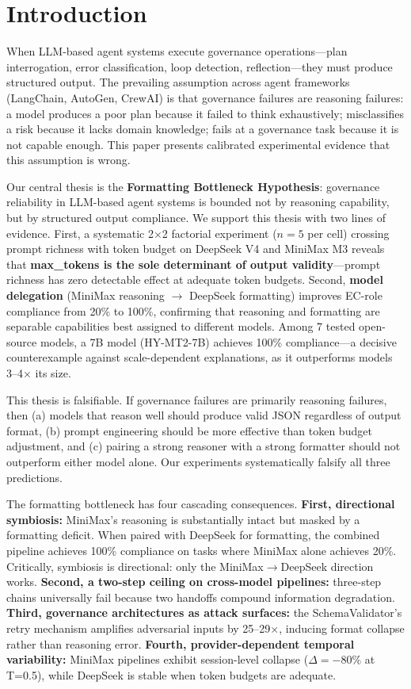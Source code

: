 \documentclass[11pt,a4paper]{article}
\begin{document}
\section{Introduction}

When LLM-based agent systems execute governance operations---plan interrogation, error classification, loop detection, reflection---they must produce structured output. The prevailing assumption across agent frameworks (LangChain, AutoGen, CrewAI) is that governance failures are reasoning failures: a model produces a poor plan because it failed to think exhaustively; misclassifies a risk because it lacks domain knowledge; fails at a governance task because it is not capable enough. This paper presents calibrated experimental evidence that this assumption is wrong.

Our central thesis is the \textbf{Formatting Bottleneck Hypothesis}: governance reliability in LLM-based agent systems is bounded not by reasoning capability, but by structured output compliance. We support this thesis with two lines of evidence. First, a systematic 2$\times$2 factorial experiment ($n=5$ per cell) crossing prompt richness with token budget on DeepSeek V4 and MiniMax M3 reveals that \textbf{max\_tokens is the sole determinant of output validity}---prompt richness has zero detectable effect at adequate token budgets. Second, \textbf{model delegation} (MiniMax reasoning $\rightarrow$ DeepSeek formatting) improves EC-role compliance from 20\% to 100\%, confirming that reasoning and formatting are separable capabilities best assigned to different models. Among 7 tested open-source models, a 7B model (HY-MT2-7B) achieves 100\% compliance---a decisive counterexample against scale-dependent explanations, as it outperforms models 3--4$\times$ its size.

This thesis is falsifiable. If governance failures are primarily reasoning failures, then (a) models that reason well should produce valid JSON regardless of output format, (b) prompt engineering should be more effective than token budget adjustment, and (c) pairing a strong reasoner with a strong formatter should not outperform either model alone. Our experiments systematically falsify all three predictions.

The formatting bottleneck has four cascading consequences. \textbf{First, directional symbiosis:} MiniMax's reasoning is substantially intact but masked by a formatting deficit. When paired with DeepSeek for formatting, the combined pipeline achieves 100\% compliance on tasks where MiniMax alone achieves 20\%. Critically, symbiosis is directional: only the MiniMax$\rightarrow$DeepSeek direction works. \textbf{Second, a two-step ceiling on cross-model pipelines:} three-step chains universally fail because two handoffs compound information degradation. \textbf{Third, governance architectures as attack surfaces:} the SchemaValidator's retry mechanism amplifies adversarial inputs by 25--29$\times$, inducing format collapse rather than reasoning error. \textbf{Fourth, provider-dependent temporal variability:} MiniMax pipelines exhibit session-level collapse ($\Delta=-80\%$ at T=0.5), while DeepSeek is stable when token budgets are adequate.
\end{document}
